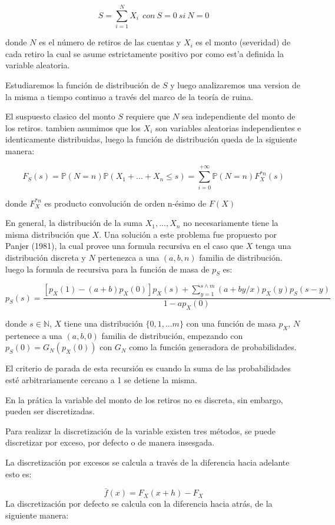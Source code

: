 \documentclass[]{article}
\begin{document}
\[S=\sum_{i=1}^{N}X_i~~con~S=0 ~si~N=0\]

donde \(N\) es el número de retiros de las cuentas y \(X_i\) es el monto
(severidad) de cada retiro la cual se asume estrictamente positivo por
como est'a definida la variable aleatoria.

Estudiaremos la función de distribución de \(S\) y luego analizaremos
una version de la misma a tiempo continuo a través del marco de la
teoría de ruina.

El suspuesto clasico del monto \(S\) requiere que \(N\) sea
independiente del monto de los retiros. tambien asumimos que los \(X_i\)
son variables aleatorias independientes e identicamente distribuidas,
luego la función de distribución queda de la siguiente manera:

\[F_{S}(s)=\mathbb{P}(N=n)\mathbb{P}(X_1+...+X_n\leq s)=\sum_{i=0}^{+\infty}\mathbb{P}(N=n)F_{X}^{*n}(s)\]

donde \(F_{X}^{*n}\) es producto convolución de orden n-ésimo de
\(F(X)\)

En general, la distribución de la suma \(X_1, ..., X_n\) no
necesariamente tiene la misma distribución que \(X\). Una solución a
este problema fue propuesto por Panjer (1981), la cual provee una
formula recursiva en el caso que \(X\) tenga una distribución discreta y
\(N\) pertenezca a una \((a,b,n)\) familia de distribución. luego la
formula de recursiva para la función de masa de \(p_S\) es:

\[p_S(s)=\frac{[p_X(1)-(a+b)p_X(0)]p_X(s)+\sum_{y=1}^{s\wedge m}(a+by/x)p_X(y)p_S(s-y)}{1-ap_X(0)}\]

donde \(s \in \mathbb{N}\), \(X\) tiene una distribución
\(\{0,1,...m\}\) con una función de masa \(p_X\), \(N\) pertenece a una
\((a,b,0)\) familia de distribución, empezando con
\(p_S(0)=G_N(p_X(0))\) con \(G_N\) como la función generadora de
probabilidades.

El criterio de parada de esta recursión es cuando la suma de las
probabilidades esté arbitrariamente cercano a 1 se detiene la misma.

En la prática la variable del monto de los retiros no es discreta, sin
embargo, pueden ser discretizadas.

Para realizar la discretización de la variable existen tres métodos, se
puede discretizar por exceso, por defecto o de manera insesgada.

La discretización por excesos se calcula a través de la diferencia hacia
adelante esto es:

\[\bar{f}(x)=F_X(x+h)-F_X\] La discretización por defecto se calcula con
la diferencia hacia atrás, de la siguiente manera:
\end{document}
